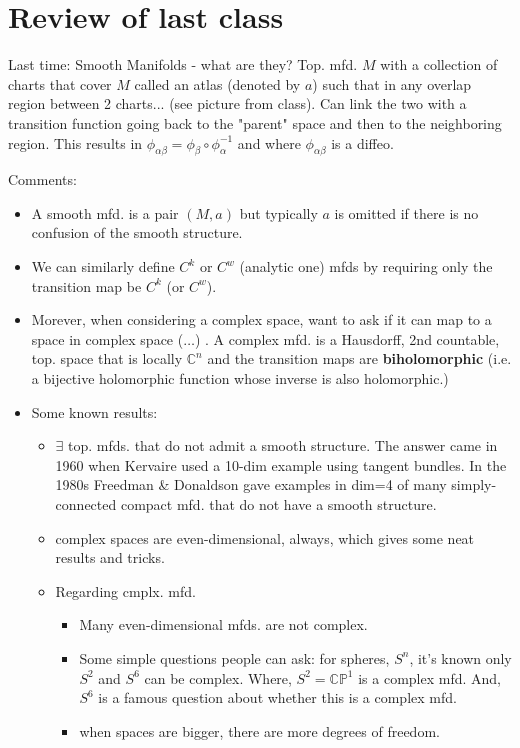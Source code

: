 \documentclass[12pt,letterpaper]{article}
\begin{document}
\section*{Review of last class}
Last time: Smooth Manifolds - what are they? Top. mfd. $M$ with a collection of charts that cover $M$ called an atlas (denoted by $a$) such that in any overlap region between 2 charts... (see picture from class). Can link the two with a transition function going back to the "parent" space and then to the neighboring region. This results in $\phi_{\alpha \beta} = \phi_{\beta} \circ \phi_{\alpha}^{-1}$ and where $\phi_{\alpha \beta}$ is a diffeo. 

Comments:
\begin{itemize}
    \item A smooth mfd. is a pair $(M,a)$ but typically $a$ is omitted if there is no confusion of the smooth structure.
    \item We can similarly define $C^k$ or $C^w$ (analytic one) mfds by requiring only the transition map be $C^k$ (or $C^w$).
    \item Morever, when considering a complex space, want to ask if it can map to a space in complex space ($\dots$) . A complex mfd. is a Hausdorff, 2nd countable, top. space that is locally $\mathbb{C}^n$ and the transition maps are \textbf{biholomorphic} (i.e. a bijective holomorphic function whose inverse is also holomorphic.)
    \item Some known results: 
    \begin{itemize}
        \item $\exists$ top. mfds. that do not admit a smooth structure. The answer came in 1960 when Kervaire used a 10-dim example using tangent bundles. In the 1980s Freedman & Donaldson gave examples in dim=4 of many simply-connected compact mfd. that do not have a smooth structure.
        \item complex spaces are even-dimensional, always, which gives some neat results and tricks.
        \item Regarding cmplx. mfd. 
        \begin{itemize}
            \item Many even-dimensional mfds. are not complex.
            \item Some simple questions people can ask: for spheres, $S^n$, it's known only $S^2$ and $S^6$ can be complex. Where, $S^2 = \mathbb{C}\mathbb{P}^1$ is a complex mfd. And, $S^6$ is a famous question about whether this is a complex mfd.
            \item when spaces are bigger, there are more degrees of freedom.

\end{itemize}
\end{itemize}
\end{itemize}
\end{document}

